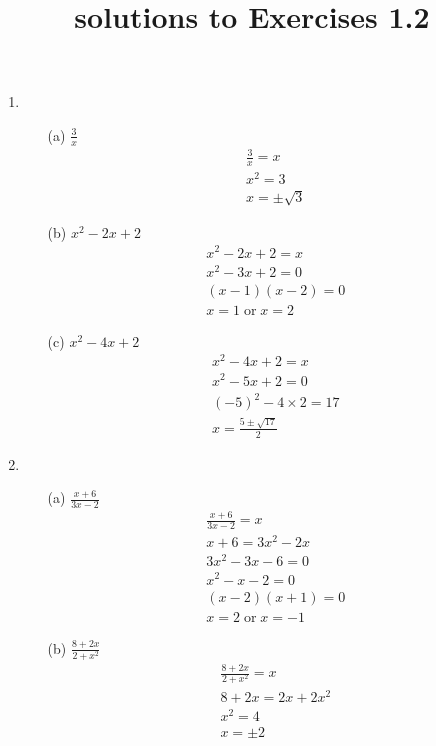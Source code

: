 \documentclass[UTF8]{ctexart}
\title{solutions to Exercises 1.2}
\begin{document}
\maketitle

\begin{enumerate}
\item \begin{itemize}
\item[(a)] $\frac{3}{x}$
\begin{gather*}
\frac{3}{x} = x\\
x^2 = 3 \\
x = \pm\sqrt{3}
\end{gather*}

\item[(b)] $x^2 - 2x + 2$
\begin{gather*}
x^2 - 2x + 2 = x \\
x^2 - 3x + 2 = 0 \\
(x - 1)(x - 2) = 0 \\
x = 1 \; \text{or} \;x = 2
\end{gather*}

\item[(c)] $x^2 - 4x + 2$
\begin{gather*}
x^2 - 4x + 2 = x \\
x^2 - 5x + 2 = 0 \\
(-5)^2 - 4 \times 2 = 17 \\
x = \frac{5 \pm \sqrt{17}}{2}
\end{gather*}

\end{itemize}

\item \begin{itemize}
\item[(a)] $\frac{x + 6}{3x - 2}$
\begin{gather*}
\frac{x + 6}{3x - 2} = x \\
x + 6 = 3x^2 - 2x \\
3x^2 - 3x - 6 = 0 \\
x^2 - x - 2 = 0 \\
(x - 2)(x + 1) = 0 \\
x = 2 \; \text{or} \; x = -1
\end{gather*}

\item[(b)] $\frac{8 + 2x}{2 + x^2}$
\begin{gather*}
\frac{8 + 2x}{2 + x^2} = x \\
8 + 2x = 2x + 2x^2 \\
x^2 = 4 \\
x = \pm 2
\end{gather*}


\end{itemize}
\end{enumerate}
\end{document}
